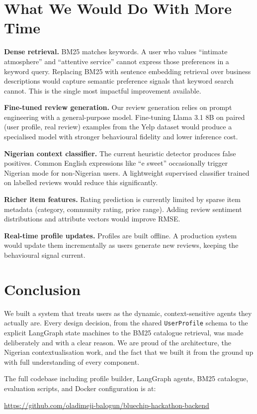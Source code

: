 \documentclass[11pt,a4paper]{article}
\begin{document}
\section{What We Would Do With More Time}

\textbf{Dense retrieval.} BM25 matches keywords. A user who values
``intimate atmosphere'' and ``attentive service'' cannot express those
preferences in a keyword query. Replacing BM25 with sentence embedding
retrieval over business descriptions would capture semantic preference
signals that keyword search cannot. This is the single most impactful
improvement available.

\textbf{Fine-tuned review generation.} Our review generation relies on
prompt engineering with a general-purpose model. Fine-tuning Llama 3.1 8B
on paired (user profile, real review) examples from the Yelp dataset would
produce a specialised model with stronger behavioural fidelity and lower
inference cost.

\textbf{Nigerian context classifier.} The current heuristic detector
produces false positives. Common English expressions like ``e sweet''
occasionally trigger Nigerian mode for non-Nigerian users. A lightweight
supervised classifier trained on labelled reviews would reduce this
significantly.

\textbf{Richer item features.} Rating prediction is currently limited by
sparse item metadata (category, community rating, price range). Adding
review sentiment distributions and attribute vectors would improve RMSE.

\textbf{Real-time profile updates.} Profiles are built offline. A
production system would update them incrementally as users generate new
reviews, keeping the behavioural signal current.

\section{Conclusion}

We built a system that treats users as the dynamic, context-sensitive
agents they actually are. Every design decision, from the shared
\texttt{UserProfile} schema to the explicit LangGraph state machines to
the BM25 catalogue retrieval, was made deliberately and with a clear
reason. We are proud of the architecture, the Nigerian contextualisation
work, and the fact that we built it from the ground up with full
understanding of every component.

The full codebase including profile builder, LangGraph agents, BM25
catalogue, evaluation scripts, and Docker configuration is at:
\begin{center}
\url{https://github.com/oladimeji-balogun/bluechip-hackathon-backend}
\end{center}
\end{document}
